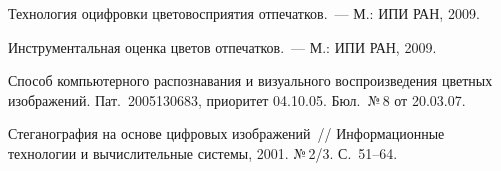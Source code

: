 \begin{multicols}{2}
{{\begin{thebibliography}{99}
  Технология оцифровки цветовосприятия отпечатков.~--- М.: ИПИ РАН, 
2009. 
  
  Инструментальная оценка цветов отпечатков.~--- М.: ИПИ РАН, 2009. 
  
  Способ компьютерного распознавания и визуального воспроизведения 
цветных изображений. Пат.\ 2005130683, приоритет 04.10.05.  Бюл.~№\,8 
от 20.03.07. 

 \label{end\stat}
  
  Стеганография на основе цифровых изображений~// Информационные 
технологии и вычислительные системы, 2001. №\,2/3. С.~51--64.
 \end{thebibliography}
}
}


\end{multicols}  
  
  

  
  